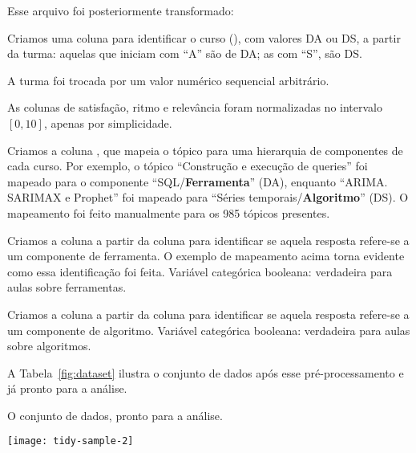 Esse arquivo foi posteriormente transformado:
\begin{compactitem}
	\item Criamos uma coluna para identificar o curso (), com valores DA ou DS, a partir da turma: aquelas que iniciam com ``A'' são de DA; as com ``S'', são DS.
	
	\item A turma foi trocada por um valor numérico sequencial arbitrário.
	
	\item As colunas de satisfação, ritmo e relevância foram normalizadas no intervalo $[0,10]$, apenas por simplicidade.

	\item Criamos a coluna , que mapeia o tópico para uma hierarquia  de componentes de cada curso.
	Por exemplo, o tópico ``Construção e execução de queries'' foi mapeado para o componente ``SQL/\textbf{Ferramenta}'' (DA), enquanto ``ARIMA. SARIMAX e Prophet'' foi mapeado para ``Séries temporais/\textbf{Algoritmo}'' (DS).
	O mapeamento foi feito manualmente para os 985 tópicos presentes.

	\item Criamos a coluna  a partir da coluna  para identificar se aquela resposta refere-se a um componente de ferramenta.
	O exemplo de mapeamento acima torna evidente como essa identificação foi feita.
	Variável categórica booleana: verdadeira para aulas sobre ferramentas.
	
	\item Criamos a coluna  a partir da coluna  para identificar se aquela resposta refere-se a um componente de algoritmo.
	Variável categórica booleana: verdadeira para aulas sobre algoritmos.
\end{compactitem}

A Tabela~\ref{fig:dataset} ilustra o conjunto de dados após esse pré-processamento e já pronto para a análise.

\begin{table}
	\centering
	\caption{O conjunto de dados, pronto para a análise.}
	\texttt{[image: tidy-sample-2]}
	\label{fig:dataset}
\end{table}